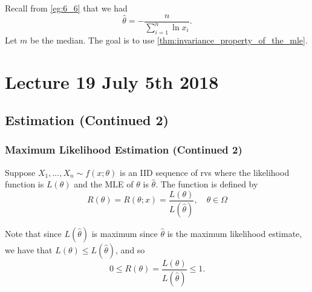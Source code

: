 \documentclass[notoc,notitlepage]{tufte-book}
\begin{document}
\begin{solution}
  Recall from \cref{eg:6_6} that we had
  \begin{equation*}
    \hat{\theta} = - \frac{n}{\sum\limits_{i=1}^{n} \ln x_i}.
  \end{equation*}
  Let $m$ be the median. The goal is to use \cref{thm:invariance_property_of_the_mle}. 
\end{solution}



\chapter{Lecture 19 July 5th 2018}%
\label{chp:lecture_19_july_5th_2018}

\section{Estimation (Continued 2)}%
\label{sec:estimation_continued_2}

\subsection{Maximum Likelihood Estimation (Continued 2)}%
\label{sub:maximum_likelihood_estimation_continued_2}

\begin{defn}
\label{defn:relative_likelihood}
  Suppose $X_1, ..., X_n \sim f(x; \theta)$ is an IID sequence of rvs where the likelihood function is $L(\theta)$ and the MLE of $\theta$ is $\hat{\theta}$. The  function is defined by
  \begin{equation*}
    R(\theta) = R(\theta; x) = \frac{L(\theta)}{L(\hat{\theta})}, \quad \theta \in \Omega 
  \end{equation*}
\end{defn}

\begin{note}
  Note that since $L(\hat{\theta})$ is maximum since $\hat{\theta}$ is the maximum likelihood estimate, we have that $L(\theta) \leq L(\hat{\theta})$, and so
  \begin{equation*}
    0 \leq R(\theta) = \frac{L(\theta)}{L(\hat{\theta})} \leq 1.
  \end{equation*}
\end{note}
\end{document}
